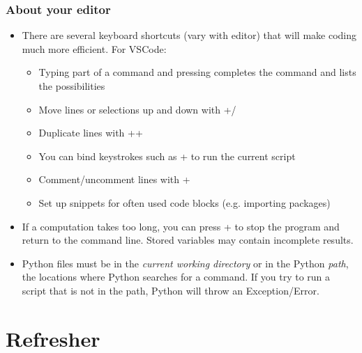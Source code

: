 \begin{frame}[fragile]
  \frametitle{About your editor}
  \begin{itemize}[<+->]
    \item There are several keyboard shortcuts (vary with editor) that will make coding much more efficient. For VSCode:
    \begin{itemize}
      \item Typing part of a command and pressing  completes the command and lists the possibilities
      \item Move lines or selections up and down with +/
      \item Duplicate lines with ++
      \item You can bind keystrokes such as + to run the current script
      \item Comment/uncomment lines with +\keystroke{/}
      \item Set up snippets for often used code blocks (e.g. importing packages)
    \end{itemize}
    \item If a computation takes too long, you can press + to stop the program and return to the command line. Stored variables may contain incomplete results.
    \item Python files must be in the \emph{current working directory} or in the Python \emph{path}, the locations where Python searches for a command. If you try to run a script that is not in the path, Python will throw an Exception/Error.
  \end{itemize}
\end{frame}


\section{Refresher}
